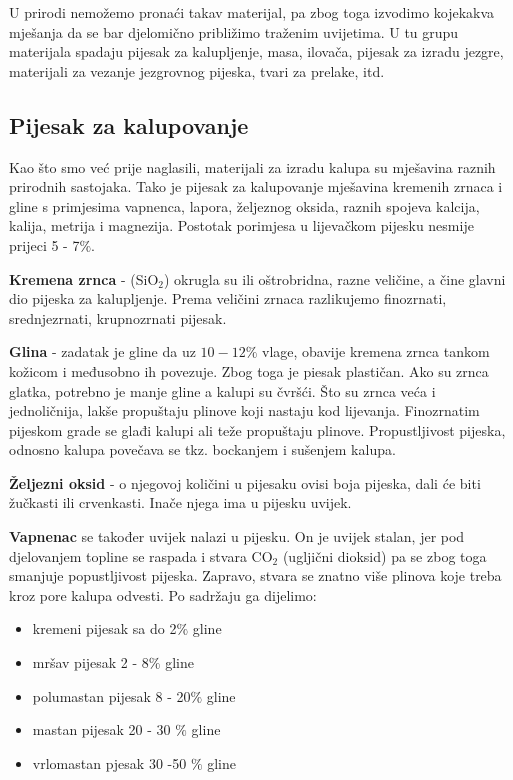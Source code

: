 \documentclass[a4paper,12pt]{article}
\numberwithin{figure}{section}
\begin{document}
U prirodi nemožemo pronaći takav materijal, pa zbog toga izvodimo kojekakva mješanja da se bar djelomično približimo traženim uvijetima. U tu grupu materijala spadaju pijesak za kalupljenje, masa, ilovača, pijesak za izradu jezgre, materijali za vezanje jezgrovnog pijeska, tvari za prelake, itd.
\subsection{Pijesak za kalupovanje}
Kao što smo već prije naglasili, materijali za izradu kalupa su mješavina raznih prirodnih sastojaka. Tako je pijesak za kalupovanje mješavina kremenih zrnaca i gline s primjesima vapnenca, lapora, željeznog oksida, raznih spojeva kalcija, kalija, metrija i magnezija. Postotak porimjesa u lijevačkom pijesku nesmije prijeci 5 - 7$\%$.\par
\textbf{Kremena zrnca} - (SiO$_{2}$) okrugla su ili oštrobridna, razne veličine, a čine glavni dio pijeska za kalupljenje. Prema veličini zrnaca razlikujemo finozrnati, srednjezrnati, krupnozrnati pijesak.\par
\textbf{Glina} - zadatak je gline da uz $10 - 12\%$ vlage, obavije kremena zrnca tankom kožicom i međusobno ih povezuje. Zbog toga je piesak plastičan. Ako su zrnca glatka, potrebno je manje gline a kalupi su čvršći. Što su zrnca veća i jednoličnija, lakše propuštaju plinove koji nastaju kod lijevanja. Finozrnatim pijeskom grade se glađi kalupi ali teže propuštaju plinove. Propustljivost pijeska, odnosno kalupa povečava se tkz. bockanjem i sušenjem kalupa.\par
\textbf{Željezni oksid} - o njegovoj količini u pijesaku ovisi boja pijeska, dali će biti žučkasti ili crvenkasti. Inače njega ima u pijesku uvijek. \par 
\textbf{Vapnenac} se također uvijek nalazi u pijesku. On je uvijek stalan, jer pod djelovanjem topline se raspada i stvara CO$_{2}$ (ugljični dioksid) pa se zbog toga smanjuje popustljivost pijeska. Zapravo, stvara se znatno više plinova koje treba kroz pore kalupa odvesti. Po sadržaju ga dijelimo:
\begin{itemize}
\item kremeni pijesak sa do 2$\%$ gline
\item mršav pijesak 2 - 8$\%$ gline
\item polumastan pijesak 8 - 20$\%$ gline
\item mastan pijesak 20 - 30 $\%$ gline
\item vrlomastan pjesak 30 -50 $\%$ gline
\end{itemize}
\end{document}
